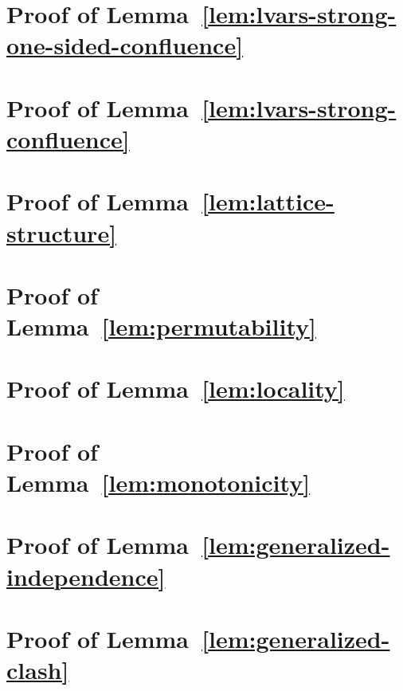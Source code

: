 \section{Proof of Lemma~\ref{lem:lvars-strong-one-sided-confluence}}\label{section:lvars-strong-one-sided-confluence-proof}


\section{Proof of Lemma~\ref{lem:lvars-strong-confluence}}\label{section:lvars-strong-confluence-proof}


\section{Proof of Lemma~\ref{lem:lattice-structure}}\label{section:lattice-structure-proof}


\section{Proof of Lemma~\ref{lem:permutability}}\label{section:permutability-proof}


\section{Proof of Lemma~\ref{lem:locality}}\label{section:locality-proof}


\section{Proof of Lemma~\ref{lem:monotonicity}}\label{section:monotonicity-proof}


\section{Proof of Lemma~\ref{lem:generalized-independence}}\label{section:generalized-independence-proof}


\section{Proof of Lemma~\ref{lem:generalized-clash}}\label{section:generalized-clash-proof}


